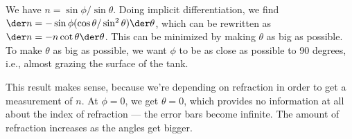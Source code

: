 We have $n=\sin\phi/\sin\theta$. Doing implicit differentiation,
we find $\der n=-\sin\phi (\cos\theta/\sin^2\theta)\der \theta$,
which can be rewritten as 
$\der n=-n\operatorname{cot}\theta\der\theta$. This can be minimized
by making $\theta$ as big as possible. To make $\theta$ as big as
possible, we want $\phi$ to be as close as possible to 90 degrees,
i.e., almost grazing the surface of the tank.

This result makes sense, because we're depending on refraction in
order to get a measurement of $n$. At $\phi=0$, we get $\theta=0$,
which provides no information at all about the index of
refraction --- the error bars become infinite. The amount of
refraction increases as the angles get bigger.

